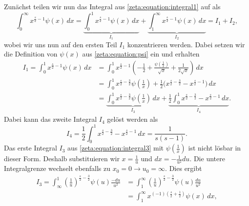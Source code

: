 Zunächst teilen wir nun das Integral aus \eqref{zeta:equation:integral1} auf als
\begin{equation}\label{zeta:equation:integral2}
    \int_0^{\infty}
    x^{\frac{s}{2}-1}
    \psi(x)
    \,dx
    =
    \underbrace{
    \int_0^{1}
    x^{\frac{s}{2}-1}
    \psi(x)
    \,dx
    }_{I_1}
    +
    \underbrace{
    \int_1^{\infty}
    x^{\frac{s}{2}-1}
    \psi(x)
    \,dx
    }_{I_2}
    =
    I_1 + I_2,
\end{equation}
wobei wir uns nun auf den ersten Teil $I_1$ konzentrieren werden.
Dabei setzen wir die Definition von $\psi(x)$ aus \eqref{zeta:equation:psi} ein und erhalten
\begin{align}
    I_1
    =
    \int_0^{1}
    x^{\frac{s}{2}-1}
    \psi(x)
    \,dx
    &=
    \int_0^{1}
    x^{\frac{s}{2}-1}
    \left(
    - \frac{1}{2}
    + \frac{\psi\left(\frac{1}{x} \right)}{\sqrt{x}}
    + \frac{1}{2 \sqrt{x}}
    \right)
    \,dx
    \\
    &=
    \int_0^{1}
    x^{\frac{s}{2}-\frac{3}{2}}
    \psi \left( \frac{1}{x} \right)
    + \frac{1}{2}
    \biggl(
    x^{\frac{s}{2}-\frac{3}{2}}
    -
    x^{\frac{s}{2}-1}
    \biggl)
    \,dx
    \\
    &=
    \underbrace{
    \int_0^{1}
    x^{\frac{s}{2}-\frac{3}{2}}
    \psi \left( \frac{1}{x} \right)
    \,dx
    }_{I_3}
    +
    \underbrace{
    \frac{1}{2}
    \int_0^1
    x^{\frac{s}{2}-\frac{3}{2}}
    -
    x^{\frac{s}{2}-1}
    \,dx
    }_{I_4}. \label{zeta:equation:integral3}
\end{align}
Dabei kann das zweite Integral $I_4$ gelöst werden als
\begin{equation}
    I_4
    =
    \frac{1}{2}
    \int_0^1
    x^{\frac{s}{2}-\frac{3}{2}}
    -
    x^{\frac{s}{2}-1}
    \,dx
    =
    \frac{1}{s(s-1)}.
\end{equation}
Das erste Integral $I_3$ aus \eqref{zeta:equation:integral3} mit $\psi \left(\frac{1}{x} \right)$ ist nicht lösbar in dieser Form.
Deshalb substituieren wir $x = \frac{1}{u}$ und $dx = -\frac{1}{u^2}du$.
Die untere Integralgrenze wechselt ebenfalls zu $x_0 = 0 \rightarrow u_0 = \infty$.
Dies ergibt
\begin{align}
    I_3
    =
    \int_{\infty}^{1}
    \left(
    \frac{1}{u}
    \right)^{\frac{s}{2}-\frac{3}{2}}
    \psi(u)
    \frac{-du}{u^2}
    &=
    \int_{1}^{\infty}
    \left(
    \frac{1}{u}
    \right)^{\frac{s}{2}-\frac{3}{2}}
    \psi(u)
    \frac{du}{u^2}
    \\
    &=
    \int_{1}^{\infty}
    x^{(-1) \left(\frac{s}{2}+\frac{1}{2}\right)}
    \psi(x)
    \,dx,
\end{align}
